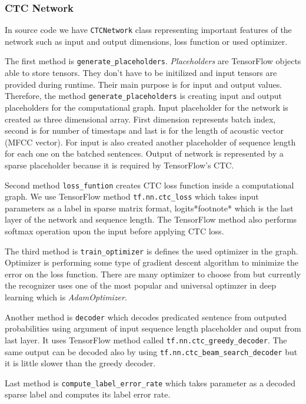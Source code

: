 \subsubsection{CTC Network}

In source code we have \texttt{CTCNetwork} class representing important features of the network such as input and output dimensions, loss function or used optimizer.

The first method is \texttt{generate\_placeholders}. \textit{Placeholders} are TensorFlow objects able to store tensors. They don't have to be initilized and input tensors are provided during runtime.
Their main purpose is for input and output values.
Therefore, the method \texttt{generate\_placeholders} is creating input and output placeholders for the computational graph.
Input placeholder for the network is created as three dimensional array. First dimension represents batch index, second is for number of timestaps and last is for the length of acoustic vector (MFCC vector).
For input is also created another placeholder of sequence length for each one on the batched sentences.
Output of network is represented by a sparse placeholder because it is required by TensorFlow's CTC.

Second method \texttt{loss\_funtion} creates CTC loss function inside a computational graph.
We use TensorFlow method \texttt{tf.nn.ctc\_loss} which takes input parameters as a label in sparse matrix format, logits*footnote* which is the last layer of the network and sequence length.
The TensorFlow method also performs softmax operation upon the input before applying CTC loss.

The third method is \texttt{train\_optimizer} is defines the used optimizer in the graph. Optimizer is performing some type of gradient descent algorithm to minimize the error on the loss function.
There are many optimizer to choose from but currently the recognizer uses one of the most popular and universal optimzer in deep learning which is \textit{AdamOptimizer}.

Another method is \texttt{decoder} which decodes predicated sentence from outputed probabilities using argument of input sequence length placeholder and ouput from last layer.
It uses TensorFlow method called \texttt{tf.nn.ctc\_greedy\_decoder}. The same output can be decoded also by using \texttt{tf.nn.ctc\_beam\_search\_decoder} but it is little slower than the greedy decoder.

Last method is \texttt{compute\_label\_error\_rate} which takes parameter as a decoded sparse label and computes its label error rate.

